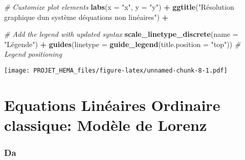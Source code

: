 \documentclass[
]{article}
\newenvironment{Shaded}{\begin{snugshade}}{\end{snugshade}}
\newcommand{\AttributeTok}[1]{\textcolor[rgb]{0.13,0.29,0.53}{#1}}
\newcommand{\CommentTok}[1]{\textcolor[rgb]{0.56,0.35,0.01}{\textit{#1}}}
\newcommand{\FunctionTok}[1]{\textcolor[rgb]{0.13,0.29,0.53}{\textbf{#1}}}
\newcommand{\NormalTok}[1]{#1}
\newcommand{\SpecialCharTok}[1]{\textcolor[rgb]{0.81,0.36,0.00}{\textbf{#1}}}
\newcommand{\StringTok}[1]{\textcolor[rgb]{0.31,0.60,0.02}{#1}}
\begin{document}
\begin{Shaded}
\begin{Highlighting}[]
  \CommentTok{\# Customize plot elements}
  \FunctionTok{labs}\NormalTok{(}\AttributeTok{x =} \StringTok{"x"}\NormalTok{, }\AttributeTok{y =} \StringTok{"y"}\NormalTok{) }\SpecialCharTok{+}
  \FunctionTok{ggtitle}\NormalTok{(}\StringTok{"Résolution graphique d\textquotesingle{}un système d\textquotesingle{}équations non linéaires"}\NormalTok{) }\SpecialCharTok{+}

  \CommentTok{\# Add the legend with updated syntax}
  \FunctionTok{scale\_linetype\_discrete}\NormalTok{(}\AttributeTok{name =} \StringTok{"Légende"}\NormalTok{) }\SpecialCharTok{+}
  \FunctionTok{guides}\NormalTok{(}\AttributeTok{linetype =} \FunctionTok{guide\_legend}\NormalTok{(}\AttributeTok{title.position =} \StringTok{"top"}\NormalTok{))  }\CommentTok{\# Legend positioning}
\end{Highlighting}
\end{Shaded}

\texttt{[image: PROJET\_HEMA\_files/figure-latex/unnamed-chunk-8-1.pdf]}

\hypertarget{equations-linuxe9aires-ordinaire-classique-moduxe8le-de-lorenz}{%
\section{Equations Linéaires Ordinaire classique: Modèle de
Lorenz}\label{equations-linuxe9aires-ordinaire-classique-moduxe8le-de-lorenz}}

\hypertarget{da}{%
\subsubsection{Da}\label{da}}
\end{document}

